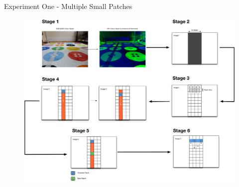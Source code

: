 \documentclass[10pt, compress]{beamer}
\begin{document}
\begin{frame}{Experiment One - Multiple Small Patches}


\vspace{-15pt}

\begin{figure}[ht!]
\centering
\includegraphics[scale=0.17]{ex1stages}
  \end{figure}
  
  
\end{frame}
\end{document}
